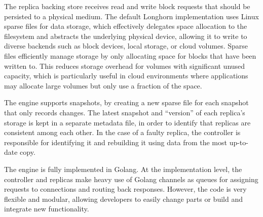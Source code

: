 The replica backing store receives read and write block requests that should be persisted to a physical medium. The default Longhorn implementation uses Linux sparse files for data storage, which effectively delegates space allocation to the filesystem and abstracts the underlying physical device, allowing it to write to diverse backends such as block devices, local storage, or cloud volumes.
Sparse files efficiently manage storage by only allocating space for blocks that have been written to. This reduces storage overhead for volumes with significant unused capacity, which is particularly useful in cloud environments where applications may allocate large volumes but only use a fraction of the space.

The engine supports snapshots, by creating a new sparse file for each snapshot that only records changes. The latest snapshot and ``version'' of each replica's storage is kept in a separate metadata file, in order to identify that replicas are consistent among each other. In the case of a faulty replica, the controller is responsible for identifying it and rebuilding it using data from the most up-to-date copy.

The engine is fully implemented in Golang. At the implementation level, the controller and replicas make heavy use of Golang channels as queues for assigning requests to connections and routing back responses. However, the code is very flexible and modular, allowing developers to easily change parts or build and integrate new functionality.




